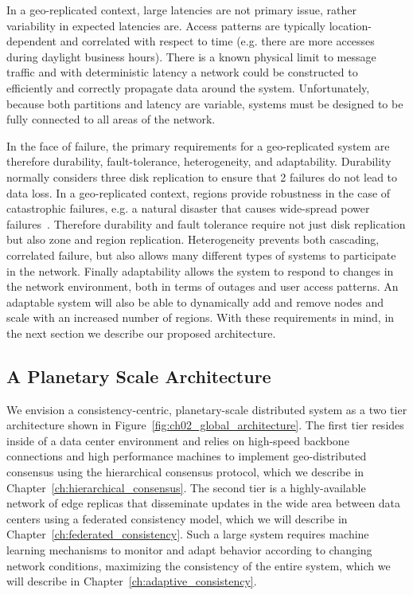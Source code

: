 In a geo-replicated context, large latencies are not primary issue, rather variability in expected latencies are.
Access patterns are typically location-dependent and correlated with respect to time (e.g. there are more accesses during daylight business hours).
There is a known physical limit to message traffic and with deterministic latency a network could be constructed to efficiently and correctly propagate data around the system.
Unfortunately, because both partitions and latency are variable, systems must be designed to be fully connected to all areas of the network.

In the face of failure, the primary requirements for a geo-replicated system are therefore durability, fault-tolerance, heterogeneity, and adaptability.
Durability normally considers three disk replication to ensure that 2 failures do not lead to data loss.
In a geo-replicated context, regions provide robustness in the case of catastrophic failures, e.g. a natural disaster that causes wide-spread power failures~\cite{cloud_deployments}.
Therefore durability and fault tolerance require not just disk replication but also zone and region replication.
Heterogeneity prevents both cascading, correlated failure, but also allows many different types of systems to participate in the network.
Finally adaptability allows the system to respond to changes in the network environment, both in terms of outages and user access patterns.
An adaptable system will also be able to dynamically add and remove nodes and scale with an increased number of regions.
With these requirements in mind, in the next section we describe our proposed architecture.

\subsection{A Planetary Scale Architecture}
\label{ch02_planetary_scale_architecture}

We envision a consistency-centric, planetary-scale distributed system as a two tier architecture shown in Figure~\ref{fig:ch02_global_architecture}.
The first tier resides inside of a data center environment and relies on high-speed backbone connections and high performance machines to implement geo-distributed consensus using the hierarchical consensus protocol, which we describe in Chapter~\ref{ch:hierarchical_consensus}.
The second tier is a highly-available network of edge replicas that disseminate updates in the wide area between data centers using a federated consistency model, which we will describe in Chapter~\ref{ch:federated_consistency}.
Such a large system requires machine learning mechanisms to monitor and adapt behavior according to changing network conditions, maximizing the consistency of the entire system, which we will describe in Chapter~\ref{ch:adaptive_consistency}.

